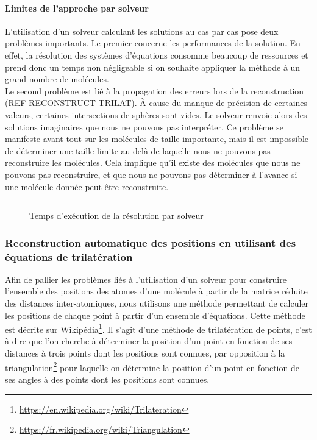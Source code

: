 \paragraph{Limites de l'approche par solveur} L'utilisation d'un solveur calculant les solutions au cas par cas pose deux problèmes importants. Le premier concerne les performances de la solution. En effet, la résolution des systèmes d'équations consomme beaucoup de ressources et prend donc un temps non négligeable si on souhaite appliquer la méthode à un grand nombre de molécules.\\
Le second problème est lié à la propagation des erreurs lors de la reconstruction (REF RECONSTRUCT TRILAT). À cause du manque de précision de certaines valeurs, certaines intersections de sphères sont vides. Le solveur renvoie alors des solutions imaginaires que nous ne pouvons pas interpréter. Ce problème se manifeste avant tout sur les molécules de taille importante, mais il est impossible de déterminer une taille limite au delà de laquelle nous ne pouvons pas reconstruire les molécules. Cela implique qu'il existe des molécules que nous ne pouvons pas reconstruire, et que nous ne pouvons pas déterminer à l'avance si une molécule donnée peut être reconstruite.

\begin{figure}[!h]
	\centering
	
	\begin{tabular}{|l|r|r|}
		
	
	\end{tabular}
	
	\caption{Temps d'exécution de la résolution par solveur}
\end{figure}

\subsubsection{Reconstruction automatique des positions en utilisant des équations de trilatération}

\par Afin de pallier les problèmes liés à l'utilisation d'un solveur pour construire l'ensemble des positions des atomes d'une molécule à partir de la matrice réduite des distances inter-atomiques, nous utilisons une méthode permettant de calculer les positions de chaque point à partir d'un ensemble d'équations. Cette méthode est décrite sur Wikipédia\footnote{\url{https://en.wikipedia.org/wiki/Trilateration}}. Il s'agit d'une méthode de trilatération de points, c'est à dire que l'on cherche à déterminer la position d'un point en fonction de ses distances à trois points dont les positions sont connues, par opposition à la triangulation\footnote{\url{https://fr.wikipedia.org/wiki/Triangulation}} pour laquelle on détermine la position d'un point en fonction de ses angles à des points dont les positions sont connues.\\

